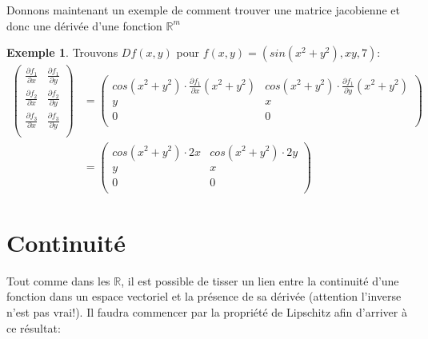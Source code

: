 \documentclass[12pt]{report}
\let\Bbb\mathbb
\theoremstyle{definition}
\newtheorem*{example}{Exemple}
\begin{document}
    Donnons maintenant un exemple de comment trouver une matrice jacobienne et donc une dérivée
    d'une fonction $\Bbb R^m$
    \begin{example}
        Trouvons $Df(x,y)$ pour $f(x,y) = (sin(x^2 + y^2), xy, 7)$:
        \begin{align*}
            \begin{pmatrix}
                \frac{\partial f_1}{\partial x} & \frac{\partial f_1}{\partial y} \\
                \frac{\partial f_2}{\partial x} & \frac{\partial f_2}{\partial y} \\
                \frac{\partial f_3}{\partial x} & \frac{\partial f_3}{\partial y} \\
            \end{pmatrix} &= \begin{pmatrix}
                cos(x^2 + y^2) \cdot \frac{\partial f_1}{\partial x}(x^2 + y^2) & cos(x^2 + y^2) \cdot \frac{\partial f_1}{\partial y} (x^2 + y^2)\\
                y & x\\
                0 & 0 \\
            \end{pmatrix} \\
            &= \begin{pmatrix}
                cos(x^2 + y^2) \cdot 2x & cos(x^2 + y^2) \cdot 2y\\
                y & x\\
                0 & 0 \\
            \end{pmatrix}
        \end{align*}
    \end{example}
\pagebreak
\section{Continuité}
    Tout comme dans les $\Bbb R$, il est possible de tisser un lien entre
    la continuité d'une fonction dans un espace vectoriel et la présence 
    de sa dérivée (attention l'inverse n'est pas vrai!). Il faudra commencer
    par la propriété de Lipschitz afin d'arriver à ce résultat:
\end{document}
